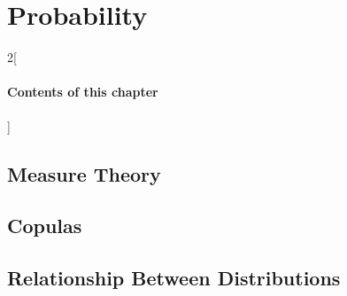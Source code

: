 \chapter{Probability}

\begin{multicols}{2}[\subsubsection*{Contents of this chapter}]
\end{multicols}


\section{Measure Theory}





\section{Copulas}


\section{Relationship Between Distributions}
